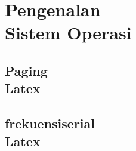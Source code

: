 \documentclass{wileySix}
\begin{document}
\subtitle{Semua Tentang Sistem Operasi}

\author{Rolly Maulana Awangga}

\halftitlepage
\titlepage







\dedication{For my family}

\contentsinbrief %
\tableofcontents
\listoffigures %
\listoftables  %


\part[Pengenalan Sistem Operasi]
{Pengenalan\\ Sistem Operasi}

\chapter[Paging]
{Paging\\ Latex}


\chapter[Frekuensi Serial]
{frekuensiserial\\ Latex}


%

%

%

%







\printindex
\end{document}
